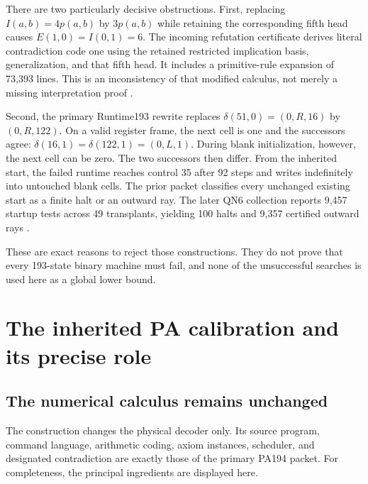 \documentclass[11pt]{article}
\begin{document}
There are two particularly decisive obstructions. First, replacing
\(I(a,b)=4p(a,b)\) by \(3p(a,b)\) while retaining the corresponding fifth
head causes \(E(1,0)=I(0,1)=6\). The incoming refutation certificate derives
literal contradiction code one using the retained restricted implication
basis, generalization, and that fifth head. It includes a primitive-rule
expansion of 73,393 lines. This is an inconsistency of that modified
calculus, not merely a missing interpretation proof \cite{negative}.

Second, the primary Runtime193 rewrite replaces
\(\delta(51,0)=(0,R,16)\) by \((0,R,122)\).
On a valid register frame, the next cell is one and the successors agree:
\(\delta(16,1)=\delta(122,1)=(0,L,1)\). During blank initialization,
however, the next cell can be zero. The two successors then differ. From
the inherited start, the failed runtime reaches control 35 after 92 steps
and writes indefinitely into untouched blank cells. The prior packet
classifies every unchanged existing start as a finite halt or an outward
ray. The later QN6 collection reports 9,457 startup tests across 49
transplants, yielding 100 halts and 9,357 certified outward rays
\cite{runtime193,qn6}.

These are exact reasons to reject those constructions. They do not prove
that every 193-state binary machine must fail, and none of the unsuccessful
searches is used here as a global lower bound.



\section{The inherited PA calibration and its precise role}
\label{sec:calibration}
\subsection{The numerical calculus remains unchanged}
The construction changes the physical decoder only. Its source program,
command language, arithmetic coding, axiom instances, scheduler, and
designated contradiction are exactly those of the primary PA194 packet.
For completeness, the principal ingredients are displayed here.
\end{document}
